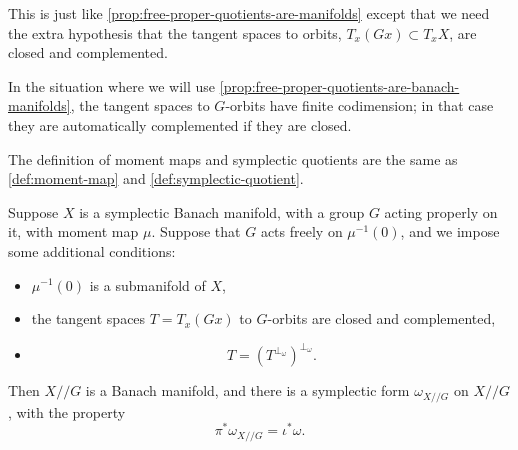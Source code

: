 \documentclass[12pt,letterpaper,reqno]{article}
\numberwithin{equation}{section}
\newcommand{\fg}{{\mathfrak g}}
\newcommand{\kq}{/\!\!/}
\DeclareMathOperator{\im}{Im}
\newcommand{\fixme}[1]{{\color{orange}{[#1]}}}
\begin{document}
\begin{prop} \label{prop:free-proper-quotients-are-banach-manifolds}
This is just like \autoref{prop:free-proper-quotients-are-manifolds}
except that we need the extra hypothesis that the
tangent spaces to orbits, 
$T_x (Gx) \subset T_x X$, are closed and complemented. \fixme{ref Bourbaki}
\end{prop}


In the situation where we will use 
\autoref{prop:free-proper-quotients-are-banach-manifolds}, the 
tangent spaces to $G$-orbits have finite codimension; in that 
case they are automatically complemented if they are closed.

\begin{defn} \label{def:banach-mm-and-sq}
The definition of moment maps and symplectic quotients are the same 
as \autoref{def:moment-map} and \autoref{def:symplectic-quotient}.
\end{defn}

\begin{thm} \label{prop:banach-symplectic-quotient-is-symplectic}
Suppose $X$ is a symplectic Banach manifold, with a group $G$
acting properly on it, with moment map $\mu$. 
Suppose that $G$ acts freely on $\mu^{-1}(0)$, and we impose
some additional conditions:
\begin{itemize}
\item $\mu^{-1}(0)$ is a submanifold of $X$,
\item the tangent
spaces $T = T_x (Gx)$ to $G$-orbits are closed and complemented,
\item \begin{equation}
  T = (T^{\perp_\omega})^{\perp_\omega}.
\end{equation}
\end{itemize}
Then $X \kq G$ is a Banach manifold, and there is a 
symplectic form $\omega_{X \kq G}$ on $X \kq G$, with the
property
\begin{equation}
  \pi^* \omega_{X \kq G} = \iota^* \omega.
\end{equation}
\end{thm}
\end{document}
